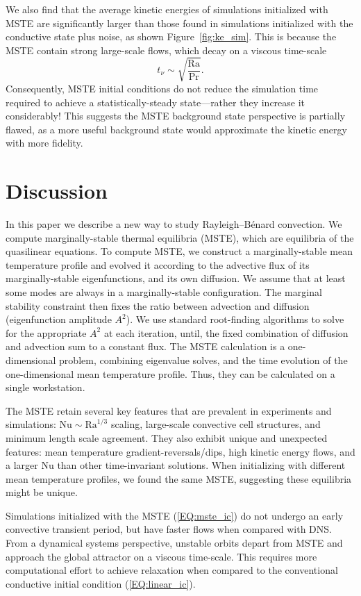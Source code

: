 \documentclass[reprint,amsmath,amssymb,aps]{revtex4-1}
\newcommand\Ra{\mathrm{Ra}}
\newcommand\Nu{\mathrm{Nu}}
\newcommand{\eq}[1]{(\ref{#1})}
\begin{document}
We also find that the average kinetic energies of simulations initialized with MSTE are significantly larger than those found in simulations initialized with the conductive state plus noise, as shown Figure~\ref{fig:ke_sim}. 
This is because the MSTE contain strong large-scale flows, which decay on a viscous time-scale
\begin{equation}
    t_{\nu} \sim \sqrt{\frac{\Ra}{\Pr}}. \nonumber
\end{equation}
Consequently, MSTE initial conditions do not reduce the simulation time required to achieve a statistically-steady state---rather they increase it considerably!
This suggests the MSTE background state perspective is partially flawed, as a more useful background state would approximate the kinetic energy with more fidelity.

\section{Discussion}\label{sec:Discussion}
In this paper we describe a new way to study Rayleigh–Bénard convection. 
We compute marginally-stable thermal equilibria (MSTE), which are equilibria of the quasilinear equations.
To compute MSTE, we construct a marginally-stable mean temperature profile and evolved it according to the advective flux of its marginally-stable eigenfunctions, and its own diffusion. 
We assume that at least some modes are always in a marginally-stable configuration. 
The marginal stability constraint then fixes the ratio between advection and diffusion (eigenfunction amplitude $A^2$). 
We use standard root-finding algorithms to solve for the appropriate $A^2$ at each iteration, until, the fixed combination of diffusion and advection sum to a constant flux.
The MSTE calculation is a one-dimensional problem, combining eigenvalue solves, and the time evolution of the one-dimensional mean temperature profile.
Thus, they can be calculated on a single workstation.

The MSTE retain several key features that are prevalent in experiments and simulations: $\Nu \sim\Ra^{1/3}$ scaling, large-scale convective cell structures, and minimum length scale agreement. 
They also exhibit unique and unexpected features: mean temperature gradient-reversals/dips, high kinetic energy flows, and a larger $\Nu$ than other time-invariant solutions. 
When initializing with different mean temperature profiles, we found the same MSTE, suggesting these equilibria might be unique.

Simulations initialized with the MSTE \eq{EQ:mste_ic} do not undergo an early convective transient period, but have faster flows when compared with DNS.
From a dynamical systems perspective, unstable orbits depart from MSTE and approach the global attractor on a viscous time-scale.
This requires more computational effort to achieve relaxation when compared to the conventional conductive initial condition \eq{EQ:linear_ic}.
\end{document}
